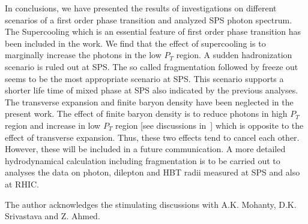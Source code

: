   In conclusions, we have presented the results of investigations on 
different scenarios of a first order phase transition and analyzed
SPS photon spectrum. The Supercooling which is an essential 
feature of first order phase transition has been included in the work.
We find that the effect of supercooling is to marginally increase the 
photons in the low $P_T$ region. A sudden hadronization scenario is ruled 
out at SPS. The so called fragmentation followed by freeze out seems 
to be the most appropriate scenario at SPS. This scenario supports a 
shorter life time of mixed phase at SPS also indicated by the previous
analyses.
  The transverse expansion and finite baryon density have been neglected
in the present work. The effect of finite baryon density is to reduce
photons in high $P_T$ region and increase in low $P_T$ 
region [see discussions in~\cite{PEITTHOMA}] which is opposite to the
effect of transverse expansion. 
Thus, these two effects tend to cancel each other.
However, these will be included in a future communication. 
 A more detailed hydrodynamical calculation including fragmentation is to 
be carried out to analyses the data on photon, dilepton and HBT radii 
measured at SPS and also at RHIC.

\acknowledgements
 The author acknowledges the stimulating discussions with A.K.
Mohanty, D.K. Srivastava and Z. Ahmed.


